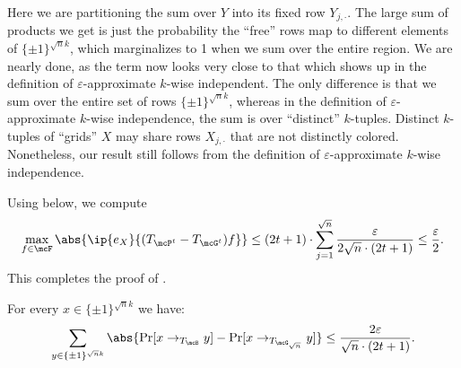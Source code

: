 Here we are partitioning the sum over $Y$ into its fixed row $Y_{j, \cdot}$. The large sum of products we get is just the probability the ``free'' rows map to different elements of $\{\pm1\}^{\sqrt{n}k}$, which marginalizes to 1 when we sum over the entire region. We are nearly done, as the term now looks very close to that which shows up in the definition of $\varepsilon$-approximate $k$-wise independent. The only difference is that we sum over the entire set of rows $\{\pm1\}^{\sqrt{n}k}$, whereas in the definition of $\varepsilon$-approximate $k$-wise independence, the sum is over ``distinct'' $k$-tuples. Distinct $k$-tuples of ``grids'' $X$ may share rows $X_{j, \cdot}$ that are not distinctly colored. Nonetheless, our result still follows from the definition of $\varepsilon$-approximate $k$-wise independence.

Using  below, we compute
\begin{equation*}
    \max_{f \in \mcF} \abs{\ip{e_X}{(T_{\mcP^t}-T_{\mcG^t}) f}} \leq (2t+1) \cdot \sum_{j=1}^{\sqrt{n}} \frac{\varepsilon}{2\sqrt{n} \cdot (2t+1)} \leq \frac\varepsilon2.
\end{equation*}
This completes the proof of .

\begin{lemma}
    \label{kwiseimplies}
    For every $x \in \{\pm1\}^{\sqrt{n}k}$ we have:
    \begin{equation*}
        \sum_{y \in \{\pm1\}^{\sqrt{n}k}} \abs{\Pr[x \to_{T_\mcB} y] - \Pr[x \to_{T_{\mcG_{\sqrt{n}}}} y]} \leq \frac{2\varepsilon}{\sqrt{n} \cdot (2t+1)}.
    \end{equation*}
\end{lemma}


